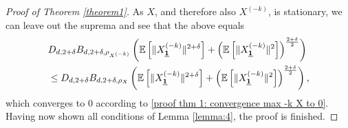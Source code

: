 \begin{proof}[Proof of Theorem \ref{theorem1}]
    As $X$, and therefore also $X^{(-k)}$, is stationary, we can leave out the suprema and see that the above equals
    \begin{align*} 
        & D_{d, {2+\delta}} B_{d, 2+\delta, \rho_{X^{(-k)}}} \left( \EE{\| X^{(-k)}_{\usbf[1]}\|^{2+\delta}} + \left( \EE{\|X^{(-k)}_{\usbf[1]}\|^2} \right)^\frac{{2+\delta}}{2} \right) \\
        & \leq D_{d, {2+\delta}} B_{d, 2+\delta, \rho_{X}} \left( \EE{\| X^{(-k)}_{\usbf[1]}\|^{2+\delta}} + \left( \EE{\|X^{(-k)}_{\usbf[1]}\|^2} \right)^\frac{{2+\delta}}{2} \right),
    \end{align*}
    which converges to $0$ according to \eqref{proof thm 1: convergence max -k X to 0}.
    Having now shown all conditions of Lemma \ref{lemma:4}, the proof is finished.
\end{proof}

